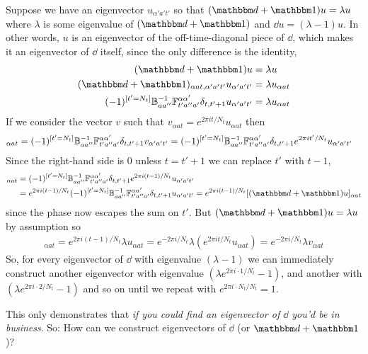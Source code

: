 Suppose we have an eigenvector $u_{\alpha' a' t'}$ so that $(\dd+\one)u = \lambda u$ where $\lambda$ is some eigenvalue of $(\dd+\one)$ and $\dd u = (\lambda-1) u$.
In other words, $u$ is an eigenvector of the off-time-diagonal piece of $\dd$, which makes it an eigenvector of $\dd$ itself, since the only difference is the identity,
\begin{align}
    (\dd+\one)u &= \lambda u
    \nonumber\\
    (\dd+\one)_{\alpha a t, \alpha' a' t'}u_{\alpha' a' t'} &= \lambda u_{\alpha a t}
    \nonumber\\
	(-1)^{[t'=N_t]} \BB\inverse_{aa''}\FF_{t' a''a'}^{\alpha\alpha'} \delta_{t,t'+1} u_{\alpha' a' t'} &= \lambda u_{\alpha a t}
\end{align}
If we consider the vector $v$ such that $v_{\alpha a t} = e^{2\pi i t/N_t} u_{\alpha a t}$ then
\begin{align}
    [(\dd+\one)v]_{\alpha a t} = 
	(-1)^{[t'=N_t]} \BB\inverse_{aa''}\FF_{t' a''a'}^{\alpha\alpha'} \delta_{t,t'+1} v_{\alpha' a' t'} &=
	(-1)^{[t'=N_t]} \BB\inverse_{aa''}\FF_{t' a''a'}^{\alpha\alpha'} \delta_{t,t'+1} e^{2\pi i t' /N_t} u_{\alpha' a' t'} 
\end{align}
Since the right-hand side is 0 unless $t=t'+1$ we can replace $t'$ with $t-1$,
\begin{align}
    [(\dd+\one)v]_{\alpha a t}
    &=
	(-1)^{[t'=N_t]} \BB\inverse_{aa''}\FF_{t' a''a'}^{\alpha\alpha'} \delta_{t,t'+1} e^{2\pi i (t-1) /N_t} u_{\alpha' a' t'} 
    \nonumber\\
    &=
	e^{2\pi i (t-1) /N_t} (-1)^{[t'=N_t]} \BB\inverse_{aa''}\FF_{t' a''a'}^{\alpha\alpha'} \delta_{t,t'+1} u_{\alpha' a' t'} 
    =
    e^{2\pi i (t-1) /N_t} [(\dd+\one)u]_{\alpha a t}
\end{align}
since the phase now escapes the sum on $t'$.
But $(\dd+\one)u = \lambda u$ by assumption so
\begin{align}
    [(\dd+\one)v]_{\alpha a t}
    =
    e^{2\pi i (t-1) /N_t} \lambda u_{\alpha a t}
    =
	e^{-2\pi i /N_t} \lambda \left(e^{2\pi i t / N_t} u_{\alpha a t}\right)
    =
    e^{-2\pi i /N_t} \lambda v_{\alpha a t}
\end{align}
So, for every eigenvector of $\dd$ with eigenvalue $(\lambda-1)$ we can immediately construct another eigenvector with eigenvalue $(\lambda e^{2\pi i \cdot 1/N_t}-1)$, and another with $(\lambda e^{2\pi i\cdot 2/N_t}-1)$ and so on until we repeat with $e^{2\pi i \cdot N_t/N_t}=1$.

This only demonstrates that \emph{if you could find an eigenvector of $\dd$ you'd be in business}.
So: How can we construct eigenvectors of $\dd$ (or $\dd+\one$)?

